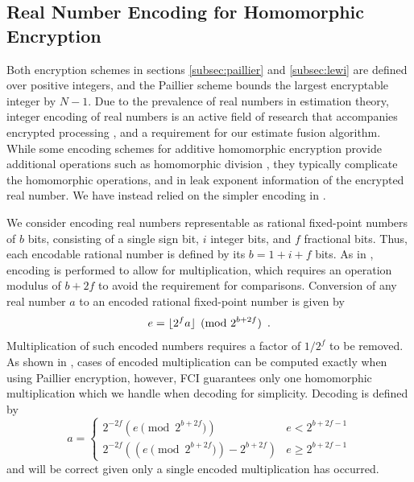 \documentclass[letterpaper, 10 pt, conference]{ieeeconf}  %
\begin{document}
\subsection{Real Number Encoding for Homomorphic Encryption} \label{subsec:encoding}
Both encryption schemes in sections \ref{subsec:paillier} and \ref{subsec:lewi} are defined over positive integers, and the Paillier scheme bounds the largest encryptable integer by $N-1$. Due to the prevalence of real numbers in estimation theory, integer encoding of real numbers is an active field of research that accompanies encrypted processing \cite{ziadCryptoImgPrivacyPreserving2016,farokhiSecurePrivateControl2017,cheonHomomorphicEncryptionArithmetic2017}, and a requirement for our estimate fusion algorithm. While some encoding schemes for additive homomorphic encryption provide additional operations such as homomorphic division \cite{ziadCryptoImgPrivacyPreserving2016}, they typically complicate the homomorphic operations, and in \cite{ziadCryptoImgPrivacyPreserving2016} leak exponent information of the encrypted real number. We have instead relied on the simpler encoding in \cite{farokhiSecurePrivateControl2017}. 

We consider encoding real numbers representable as rational fixed-point numbers of $b$ bits, consisting of a single sign bit, $i$ integer bits, and $f$ fractional bits. Thus, each encodable rational number is defined by its $b=1+i+f$ bits. As in \cite{farokhiSecurePrivateControl2017}, encoding is performed to allow for multiplication, which requires an operation modulus of $b+2f$ to avoid the requirement for comparisons. Conversion of any real number $a$ to an encoded rational fixed-point number is given by
\begin{equation}
   e = \lfloor{2^f a}\rfloor\pmod{2^{b + 2f}}\enspace. \label{eqn:qmn}
\end{equation}
Multiplication of such encoded numbers requires a factor of $1/2^f$ to be removed. As shown in \cite{farokhiSecurePrivateControl2017}, cases of encoded multiplication can be computed exactly when using Paillier encryption, however, FCI guarantees only one homomorphic multiplication which we handle when decoding for simplicity. Decoding is defined by
\begin{equation}
   a=
   \begin{cases}
      2^{-2f}\left(e \!\!\pmod{2^{b+2f}}\right) & e<2^{b+2f-1} \\
      2^{-2f}\left((e \!\!\pmod{2^{b+2f}}) - 2^{b+2f}\right) & e\geq 2^{b+2f-1}
   \end{cases} \label{eqn:qmn_mult_decode}
\end{equation}
and will be correct given only a single encoded multiplication has occurred.
\end{document}
